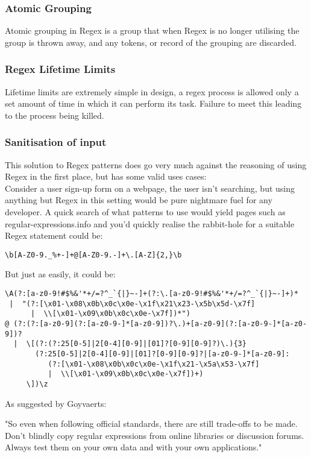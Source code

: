 \documentclass{IEEEtran}
\begin{document}
            \subsubsection{Atomic Grouping}
                Atomic grouping in Regex is a group that when Regex is no longer utilising 
                the group is thrown away, and any tokens, or record of the grouping are discarded.
            \subsubsection{Regex Lifetime Limits}
                Lifetime limits are extremely simple in design, a regex process is allowed only 
                a set amount of time in which it can perform its task. Failure to meet this 
                leading to the process being killed.
            \subsubsection{Sanitisation of input}
                This solution to Regex patterns does go very much against the reasoning of 
                using Regex in the first place, but has some valid uses cases:\\
                Consider a user sign-up form on a webpage, the user isn't searching, but 
                using anything but Regex in this setting would be pure nightmare fuel for 
                any developer. A quick search of what patterns to use would yield pages such as
                regular-expressions.info\cite{RegularExpressions.info} and you'd quickly realise
                the rabbit-hole for a suitable Regex statement could be:

                \begin{verbatim}
\b[A-Z0-9._%+-]+@[A-Z0-9.-]+\.[A-Z]{2,}\b
                \end{verbatim}

                But just as easily, it could be: 

                \begin{verbatim}
\A(?:[a-z0-9!#$%&'*+/=?^_`{|}~-]+(?:\.[a-z0-9!#$%&'*+/=?^_`{|}~-]+)*
 |  "(?:[\x01-\x08\x0b\x0c\x0e-\x1f\x21\x23-\x5b\x5d-\x7f]
      |  \\[\x01-\x09\x0b\x0c\x0e-\x7f])*")
@ (?:(?:[a-z0-9](?:[a-z0-9-]*[a-z0-9])?\.)+[a-z0-9](?:[a-z0-9-]*[a-z0-9])?
  |  \[(?:(?:25[0-5]|2[0-4][0-9]|[01]?[0-9][0-9]?)\.){3}
       (?:25[0-5]|2[0-4][0-9]|[01]?[0-9][0-9]?|[a-z0-9-]*[a-z0-9]:
          (?:[\x01-\x08\x0b\x0c\x0e-\x1f\x21-\x5a\x53-\x7f]
          |  \\[\x01-\x09\x0b\x0c\x0e-\x7f])+)
     \])\z
                \end{verbatim}
                As suggested by Goyvaerts\cite{RegularExpressions.info}:
                \begin{displayquote}
                    "So even when following official standards, there are still trade-offs to be made. Don't blindly copy regular expressions from online libraries or discussion forums. Always test them on your own data and with your own applications."
                \end{displayquote}
\end{document}
